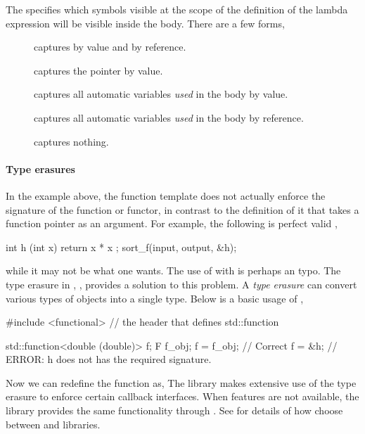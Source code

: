The  specifies which symbols visible at the scope of
the definition of the lambda expression will be visible inside the body. There
are a few forms,
\begin{description}
  \item[\cppinline{[a, &b]}] captures  by value and 
    by reference.
  \item[\cppinline{[this]}] captures the  pointer by value.
  \item[\cppinline{[=]}] captures all automatic variables \emph{used} in the
    body by value.
  \item[\cppinline{[&]}] captures all automatic variables \emph{used} in the
    body by reference.
  \item[\cppinline{[]}] captures nothing.
\end{description}

\paragraph{Type erasures}

In the example above, the function template  does not
actually enforce the signature of the function or functor, in contrast to the
definition of it that takes a function pointer as an argument. For example,
the following is perfect valid \cpp,
\begin{cppcode}
int h (int x) { return x * x };
sort_f(input, output, &h);
\end{cppcode}
while it may not be what one wants. The use of  with
 is perhaps an typo. The type erasure in \cppoo{},
, provides a solution to this problem. A \emph{type
  erasure} can convert various types of objects into a single type. Below is a
basic usage of ,
\begin{cppcode}
#include <functional> // the header that defines std::function

std::function<double (double)> f;
F f_obj;
f = f_obj;  // Correct
f = &h;     // ERROR: h does not has the required signature.
\end{cppcode}
Now we can redefine the function  as,
The \vsmc library makes extensive use of the type erasure to enforce certain
callback interfaces. When \cppoo features are not available, the \boost
library provides the same functionality through .
See \cite{vsmcjss} for details of how \vsmc choose between \cppoo and \boost
libraries.
